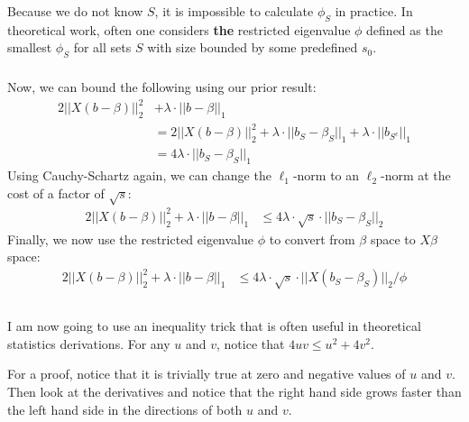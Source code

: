 \begin{frame}[fragile] \frametitle{}

Because we do not know $S$, it is impossible to calculate $\phi_S$ in practice.
In theoretical work, often one considers \textbf{the} restricted eigenvalue
$\phi$ defined as the smallest $\phi_S$ for all sets $S$ with size bounded by
some predefined $s_0$.

\end{frame}

\begin{frame}[fragile] \frametitle{}

Now, we can bound the following using our prior result:
\begin{align*}
2 || X ( b - \beta) ||_2^2 &+ \lambda \cdot || b - \beta ||_1 \\
  &= 2 || X ( b - \beta) ||_2^2 + \lambda \cdot || b_S - \beta_S ||_1 + \lambda \cdot || b_{S^c} ||_1 \\
  &= 4 \lambda \cdot || b_S - \beta_S ||_1
\end{align*}
\pause Using Cauchy-Schartz again, we can change the $\ell_1$-norm to an $\ell_2$-norm at
the cost of a factor of $\sqrt{s}$:
\begin{align*}
2 || X ( b - \beta) ||_2^2 + \lambda \cdot || b - \beta ||_1
  &\leq 4 \lambda \cdot \sqrt{s} \cdot || b_S - \beta_S ||_2
\end{align*}
\pause Finally, we now use the restricted eigenvalue $\phi$ to convert from $\beta$ space
to $X \beta$ space:
\begin{align*}
2 || X ( b - \beta) ||_2^2 + \lambda \cdot || b - \beta ||_1
  &\leq 4 \lambda \cdot \sqrt{s} \cdot || X( b_S - \beta_S) ||_2 / \phi \\
\end{align*}

\end{frame}

\begin{frame}[fragile] \frametitle{}

I am now going to use an inequality trick that is often useful in
theoretical statistics derivations. For any $u$ and $v$, notice that
$4uv \leq u^2 + 4 v^2$.

For a proof, notice that it is trivially true at zero and negative values
of $u$ and $v$. Then look at the derivatives and notice that the right hand
side grows faster than the left hand side in the directions of both $u$ and
$v$.

\end{frame}


